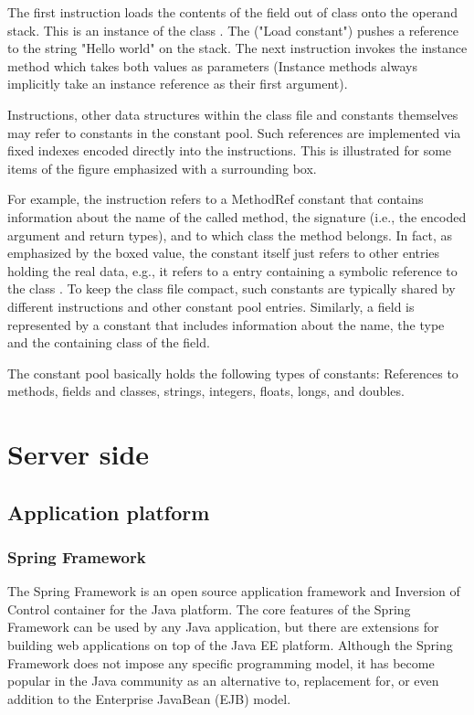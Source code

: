 The first instruction loads the contents of the field out of class
 onto the operand stack. This is an instance of the class
. The  ("Load constant") pushes a reference
to the string "Hello world" on the stack. The next instruction invokes the
instance method  which takes both values as parameters (Instance
methods always implicitly take an instance reference as their first argument).

Instructions, other data structures within the class file and constants
themselves may refer to constants in the constant pool. Such references are
implemented via fixed indexes encoded directly into the instructions. This is
illustrated for some items of the figure emphasized with a surrounding box.

For example, the  instruction refers to a MethodRef constant that
contains information about the name of the called method, the signature (i.e.,
the encoded argument and return types), and to which class the method belongs.
In fact, as emphasized by the boxed value, the  constant itself just
refers to other entries holding the real data, e.g., it refers to a
 entry containing a symbolic reference to the class
. To keep the class file compact, such constants are
typically shared by different instructions and other constant pool entries.
Similarly, a field is represented by a  constant that includes
information about the name, the type and the containing class of the field.

The constant pool basically holds the following types of constants: References
to methods, fields and classes, strings, integers, floats, longs, and doubles.


\section{Server side}\label{sect:serverside}

\subsection{Application platform}

\subsubsection{Spring Framework~\cite{SpringWeb}}
%
The Spring Framework is an open source application framework and Inversion of
Control container for the Java platform. The core features of the Spring
Framework can be used by any Java application, but there are extensions for
building web applications on top of the Java EE platform. Although the Spring
Framework does not impose any specific programming model, it has become popular
in the Java community as an alternative to, replacement for, or even addition to
the Enterprise JavaBean (EJB) model.

